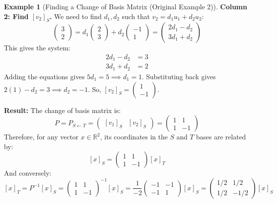 \documentclass[11pt]{article}
\theoremstyle{definition}
\newtheorem{example}[theorem]{Example}
\theoremstyle{remark}
\newcommand{\R}{\mathbb{R}}
\newcommand{\Rn}[1]{\R^{#1}}
\newcommand{\coord}[2]{[#1]_{#2}} %
\begin{document}
\begin{example}[Finding a Change of Basis Matrix (Original Example 2)]
    \textbf{Column 2: Find $\coord{v_2}{S}$.} We need to find $d_1, d_2$ such that $v_2 = d_1 u_1 + d_2 u_2$:
    \[ \begin{pmatrix} 3 \\ 2 \end{pmatrix} = d_1 \begin{pmatrix} 2 \\ 3 \end{pmatrix} + d_2 \begin{pmatrix} -1 \\ 1 \end{pmatrix} = \begin{pmatrix} 2d_1 - d_2 \\ 3d_1 + d_2 \end{pmatrix} \]
    This gives the system:
    \begin{align*} 2d_1 - d_2 &= 3 \\ 3d_1 + d_2 &= 2 \end{align*}
    Adding the equations gives $5d_1 = 5 \implies d_1 = 1$. Substituting back gives $2(1) - d_2 = 3 \implies d_2 = -1$.
    So, $\coord{v_2}{S} = \begin{pmatrix} 1 \\ -1 \end{pmatrix}$.

    \textbf{Result:} The change of basis matrix is:
    \[ P = P_{S \leftarrow T} = \begin{pmatrix} \coord{v_1}{S} & \coord{v_2}{S} \end{pmatrix} = \begin{pmatrix} 1 & 1 \\ 1 & -1 \end{pmatrix} \]
    Therefore, for any vector $x \in \Rn{2}$, its coordinates in the $S$ and $T$ bases are related by:
    \[ \coord{x}{S} = \begin{pmatrix} 1 & 1 \\ 1 & -1 \end{pmatrix} \coord{x}{T} \]
    And conversely:
    \[ \coord{x}{T} = P^{-1} \coord{x}{S} = \begin{pmatrix} 1 & 1 \\ 1 & -1 \end{pmatrix}^{-1} \coord{x}{S} = \frac{1}{-2} \begin{pmatrix} -1 & -1 \\ -1 & 1 \end{pmatrix} \coord{x}{S} = \begin{pmatrix} 1/2 & 1/2 \\ 1/2 & -1/2 \end{pmatrix} \coord{x}{S} \]
\end{example}
\end{document}
